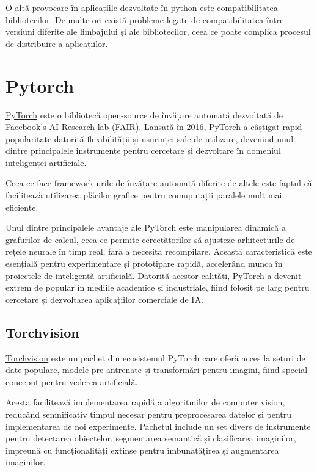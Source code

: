 O altă provocare în aplicațiile dezvoltate în python este compatibilitatea bibliotecilor. De multe ori există probleme legate de compatibilitatea între versiuni diferite ale limbajului și ale bibliotecilor, ceea ce poate complica procesul de distribuire a aplicațiilor. 


\section{Pytorch}

\href{https://pytorch.org/}{PyTorch} este o bibliotecă open-source de învățare automată dezvoltată de Facebook's AI Research lab (FAIR). Lansată în 2016, PyTorch a câștigat rapid popularitate datorită flexibilității și ușurinței sale de utilizare, devenind unul dintre principalele instrumente pentru cercetare și dezvoltare în domeniul inteligenței artificiale.

Ceea ce face framework-urile de învățare automată diferite de altele este faptul că facilitează utilizarea plăcilor grafice pentru comuputații paralele mult mai eficiente. 

Unul dintre principalele avantaje ale PyTorch este manipularea dinamică a grafurilor de calcul, ceea ce permite cercetătorilor să ajusteze arhitecturile de rețele neurale în timp real, fără a necesita recompilare. Această caracteristică este esențială pentru experimentare și prototipare rapidă, accelerând munca în proiectele de inteligență artificială. Datorită acestor calități, PyTorch a devenit extrem de popular în mediile academice și industriale, fiind folosit pe larg pentru cercetare și dezvoltarea aplicațiilor comerciale de IA.

\subsection{Torchvision}

\href{https://pytorch.org/vision/stable/index.html}{Torchvision} este un pachet din ecosistemul PyTorch care oferă acces la seturi de date populare, modele pre-antrenate și transformări pentru imagini, fiind special conceput pentru vederea artificială. 

Acesta facilitează implementarea rapidă a algoritmilor de computer vision, reducând semnificativ timpul necesar pentru preprocesarea datelor și pentru implementarea de noi experimente. Pachetul include un set divers de instrumente pentru detectarea obiectelor, segmentarea semantică și clasificarea imaginilor, împreună cu funcționalități extinse pentru îmbunătățirea și augmentarea imaginilor. 

